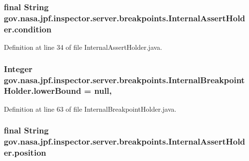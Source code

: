 \subsubsection[{\texorpdfstring{condition}{condition}}]{\setlength{\rightskip}{0pt plus 5cm}final String gov.\+nasa.\+jpf.\+inspector.\+server.\+breakpoints.\+Internal\+Assert\+Holder.\+condition\hspace{0.3cm}{\ttfamily [private]}}\hypertarget{classgov_1_1nasa_1_1jpf_1_1inspector_1_1server_1_1breakpoints_1_1_internal_assert_holder_a18995a52b515cf975da374c2fc7af651}{}\label{classgov_1_1nasa_1_1jpf_1_1inspector_1_1server_1_1breakpoints_1_1_internal_assert_holder_a18995a52b515cf975da374c2fc7af651}


Definition at line 34 of file Internal\+Assert\+Holder.\+java.

\subsubsection[{\texorpdfstring{lower\+Bound}{lowerBound}}]{\setlength{\rightskip}{0pt plus 5cm}Integer gov.\+nasa.\+jpf.\+inspector.\+server.\+breakpoints.\+Internal\+Breakpoint\+Holder.\+lower\+Bound = null\hspace{0.3cm}{\ttfamily [protected]}, {\ttfamily [inherited]}}\hypertarget{classgov_1_1nasa_1_1jpf_1_1inspector_1_1server_1_1breakpoints_1_1_internal_breakpoint_holder_ae884e78a734be2e3d219243eb2b3aa12}{}\label{classgov_1_1nasa_1_1jpf_1_1inspector_1_1server_1_1breakpoints_1_1_internal_breakpoint_holder_ae884e78a734be2e3d219243eb2b3aa12}


Definition at line 63 of file Internal\+Breakpoint\+Holder.\+java.

\subsubsection[{\texorpdfstring{position}{position}}]{\setlength{\rightskip}{0pt plus 5cm}final String gov.\+nasa.\+jpf.\+inspector.\+server.\+breakpoints.\+Internal\+Assert\+Holder.\+position\hspace{0.3cm}{\ttfamily [private]}}\hypertarget{classgov_1_1nasa_1_1jpf_1_1inspector_1_1server_1_1breakpoints_1_1_internal_assert_holder_ab517a8591e91531f34cfc9b4fe758c41}{}\label{classgov_1_1nasa_1_1jpf_1_1inspector_1_1server_1_1breakpoints_1_1_internal_assert_holder_ab517a8591e91531f34cfc9b4fe758c41}


